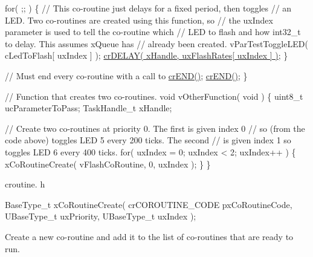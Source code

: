 \begin{DoxyPre}  for( ;; )
  \{
      // This co-routine just delays for a fixed period, then toggles
      // an LED.  Two co-routines are created using this function, so
      // the uxIndex parameter is used to tell the co-routine which
      // LED to flash and how int32\_t to delay.  This assumes xQueue has
      // already been created.
      vParTestToggleLED( cLedToFlash[ uxIndex ] );
      \hyperlink{vendor_2ceedling_2plugins_2freertos_2src_2freertos_2include_2croutine_8h_a05a06feb11028f2d1d440ea335f562ba}{crDELAY( xHandle, uxFlashRates[ uxIndex ] )};
  \}\end{DoxyPre}



\begin{DoxyPre}  // Must end every co-routine with a call to \hyperlink{vendor_2ceedling_2plugins_2freertos_2src_2freertos_2include_2croutine_8h_ae6038cc976689b50000475ebfc4e2f23}{crEND()};
  \hyperlink{vendor_2ceedling_2plugins_2freertos_2src_2freertos_2include_2croutine_8h_ae6038cc976689b50000475ebfc4e2f23}{crEND()};
\}\end{DoxyPre}



\begin{DoxyPre}// Function that creates two co-routines.
void vOtherFunction( void )
\{
uint8\_t ucParameterToPass;
TaskHandle\_t xHandle;\end{DoxyPre}



\begin{DoxyPre}  // Create two co-routines at priority 0.  The first is given index 0
  // so (from the code above) toggles LED 5 every 200 ticks.  The second
  // is given index 1 so toggles LED 6 every 400 ticks.
  for( uxIndex = 0; uxIndex < 2; uxIndex++ )
  \{
      xCoRoutineCreate( vFlashCoRoutine, 0, uxIndex );
  \}
\}
\end{DoxyPre}


croutine. h 
\begin{DoxyPre}
BaseType\_t xCoRoutineCreate(
                                crCOROUTINE\_CODE pxCoRoutineCode,
                                UBaseType\_t uxPriority,
                                UBaseType\_t uxIndex
                              );\end{DoxyPre}


Create a new co-\/routine and add it to the list of co-\/routines that are ready to run.


